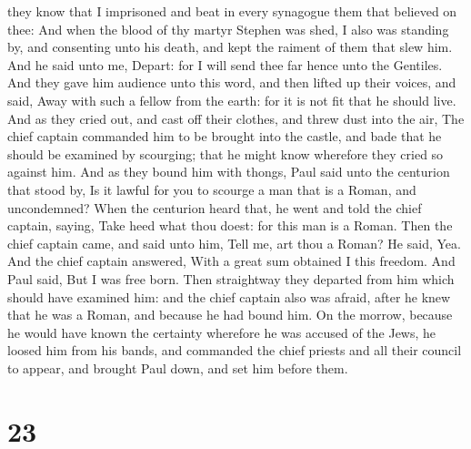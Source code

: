 they know that I imprisoned and beat in every synagogue them that
believed on thee:  And when the blood of thy martyr
Stephen was shed, I also was standing by, and consenting unto his death,
and kept the raiment of them that slew him.  And he said
unto me, Depart: for I will send thee far hence unto the Gentiles.
 And they gave him audience unto this word, and then
lifted up their voices, and said, Away with such a fellow from the
earth: for it is not fit that he should live.  And as
they cried out, and cast off their clothes, and threw dust into the air,
 The chief captain commanded him to be brought into the
castle, and bade that he should be examined by scourging; that he might
know wherefore they cried so against him.  And as they
bound him with thongs, Paul said unto the centurion that stood by, Is it
lawful for you to scourge a man that is a Roman, and uncondemned?
 When the centurion heard that, he went and told the
chief captain, saying, Take heed what thou doest: for this man is a
Roman.  Then the chief captain came, and said unto him,
Tell me, art thou a Roman? He said, Yea.  And the chief
captain answered, With a great sum obtained I this freedom. And Paul
said, But I was free born.  Then straightway they
departed from him which should have examined him: and the chief captain
also was afraid, after he knew that he was a Roman, and because he had
bound him.  On the morrow, because he would have known
the certainty wherefore he was accused of the Jews, he loosed him from
his bands, and commanded the chief priests and all their council to
appear, and brought Paul down, and set him before them.

\hypertarget{section-22}{%
\section{23}\label{section-22}}

